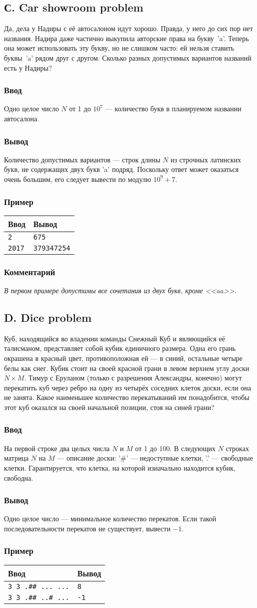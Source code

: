 \documentclass[10pt, a4paper]{article}
\newcommand{\informat}[1]
{
	\subsubsection*{Ввод} #1
}
\newcommand{\outformat}[1]
{
	\subsubsection*{Вывод} #1
}
\newcommand{\examplee}[4]
{
	\subsubsection*{Пример}
	\noindent
	\begin{center}
	\begin{tabularx}{\linewidth}{|X|X|}
	\hline
	Ввод 	& Вывод  	\\
	\hline
	{\tt #1} & {\tt #2}	\\
	\hline
	{\tt #3} & {\tt #4}	\\
	\hline
	\end{tabularx}
	\end{center}
}
\newcommand{\excomm}[1]
{
	\subsubsection*{Комментарий}
	\textit{#1}
}
\begin{document}
\subsection*{С. Car showroom problem}


Да, дела у Надиры с её автосалоном идут хорошо. Правда, у него до сих пор нет названия. Надира даже частично выкупила авторские права на букву~'a'. Теперь она может использовать эту букву, но не слишком часто: ей нельзя ставить буквы~'a' рядом друг с другом. Сколько разных допустимых вариантов названий есть у Надиры?

\informat{Одно целое число $N$ от 1 до $10^7$ --- количество букв в планируемом названии автосалона.}
 
\outformat{Количество допустимых вариантов --- строк длины $N$ из строчных латинских букв, не содержащих двух букв 'a' подряд. Поскольку ответ может оказаться очень большим, его следует вывести по модулю $10^9 + 7$.}
 
\examplee{2}{675}{2017}{379347254}
 
\excomm{В первом примере допустимы все сочетания из двух букв, кроме <<aa>>.}


 
\subsection*{D. Dice problem}


Куб, находящийся во владении команды Снежный Куб и являющийся её талисманом, представляет собой кубик единичного размера. Одна его грань окрашена в красный цвет, противоположная ей --- в синий, остальные четыре белы как снег. Кубик стоит на своей красной грани в левом верхнем углу доски $N \times M$. Тимур с Еруланом (только с разрешения Александры, конечно) могут перекатить куб через ребро на одну из четырёх соседних клеток доски, если она не занята. Какое наименьшее количество перекатываний им понадобится, чтобы этот куб оказался на своей начальной позиции, стоя на синей грани?

\informat{На первой строке два целых числа $N$ и $M$ от 1 до 100. В следующих $N$ строках матрица $N$ на $M$ --- описание доски: '\#' --- недоступные клетки, '.' --- свободные клетки. Гарантируется, что клетка, на которой изначально находится кубик, свободна.}
 
\outformat{Одно целое число --- минимальное количество перекатов. Если такой по\-сле\-до\-ва\-тель\-нос\-ти перекатов не существует, вывести $-1$.}

\examplee{3 3 \newline
.\#\# \newline
...\newline
...}
{8}
{3 3 \newline
.\#\# \newline
..\#\newline
...}
{-1}
\end{document}
